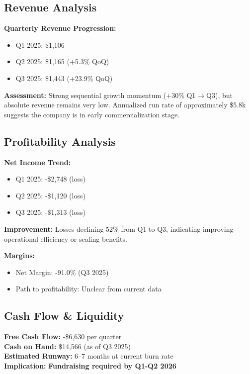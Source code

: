 \documentclass[11pt,a4paper]{article}
\begin{document}
\subsection{Revenue Analysis}

\textbf{Quarterly Revenue Progression:}
\begin{itemize}[itemsep=2pt]
    \item Q1 2025: \$1,106
    \item Q2 2025: \$1,165 (\textcolor{bullish}{+5.3\% QoQ})
    \item Q3 2025: \$1,443 (\textcolor{bullish}{+23.9\% QoQ})
\end{itemize}

\textbf{Assessment:} Strong sequential growth momentum (+30\% Q1$\rightarrow$Q3), but absolute revenue remains very low. Annualized run rate of approximately \$5.8k suggests the company is in early commercialization stage.

\subsection{Profitability Analysis}

\textbf{Net Income Trend:}
\begin{itemize}[itemsep=2pt]
    \item Q1 2025: -\$2,748 (loss)
    \item Q2 2025: -\$1,120 (loss)
    \item Q3 2025: -\$1,313 (loss)
\end{itemize}

\textbf{Improvement:} Losses declining 52\% from Q1 to Q3, indicating improving operational efficiency or scaling benefits.

\textbf{Margins:}
\begin{itemize}[itemsep=2pt]
    \item Net Margin: -91.0\% (Q3 2025)
    \item Path to profitability: Unclear from current data
\end{itemize}

\subsection{Cash Flow \& Liquidity}

\begin{tcolorbox}[colback=bearish!10, colframe=bearish!60, title=Critical Cash Burn Alert]
\textbf{Free Cash Flow:} -\$6,630 per quarter \\
\textbf{Cash on Hand:} \$14,566 (as of Q3 2025) \\
\textbf{Estimated Runway:} 6--7 months at current burn rate \\
\textbf{Implication:} \textcolor{bearish}{\textbf{Fundraising required by Q1-Q2 2026}}
\end{tcolorbox}
\end{document}
